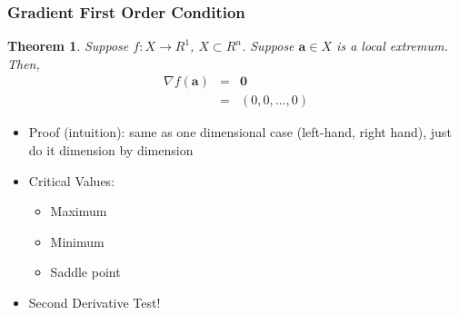 \documentclass{beamer}
\newtheorem{thm}{Theorem}
\numberwithin{equation}{section}
\begin{document}
\begin{frame}
\frametitle{Gradient First Order Condition}

\begin{thm}
Suppose $f:X \rightarrow R^{1}$, $X \subset R^{n}$.  Suppose $\boldsymbol{a} \in X$ is a local extremum.  Then, 
\begin{eqnarray}
\nabla f(\boldsymbol{a}) & = & \boldsymbol{0} \nonumber \\
									& = & (0, 0, \hdots, 0) \nonumber 				
\end{eqnarray}

\end{thm} \pause

\begin{itemize}
\item[-] Proof (intuition): same as one dimensional case (left-hand, right hand), just do it dimension by dimension \pause
\item[-] Critical Values: 
\begin{itemize}
\item[1)] Maximum
\item[2)] Minimum 
\item[3)] Saddle point
\end{itemize}
\item[-] Second Derivative Test!
\end{itemize}

\end{frame}
\end{document}
